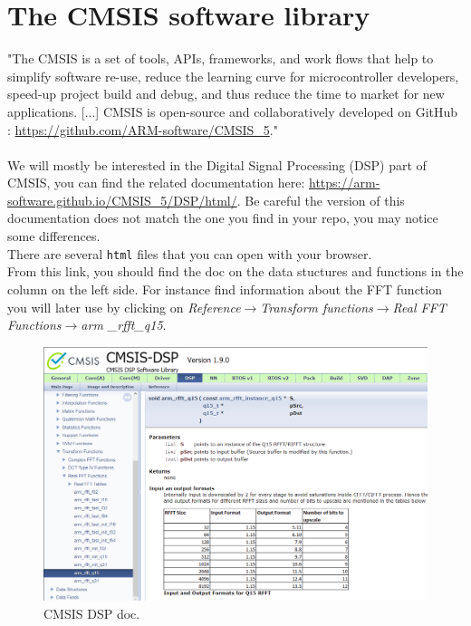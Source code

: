 \section{The CMSIS software library}
%
"The CMSIS is a set of tools, APIs, frameworks, and work flows that help to simplify software re-use, reduce the learning curve for microcontroller developers, speed-up project build and debug, and thus reduce the time to market for new applications. [...] CMSIS is open-source and collaboratively developed on GitHub : \url{https://github.com/ARM-software/CMSIS_5}." \\
\\
%
We will mostly be interested in the Digital Signal Processing (DSP) part of CMSIS, you can find the related documentation here: \url{https://arm-software.github.io/CMSIS_5/DSP/html/}. Be careful the version of this documentation does not match the one you find in your repo, you may notice some differences.\\
There are several \texttt{html} files that you can open with your browser. \\
From this link, you should find the doc on the data stuctures and functions in the column on the left side. For instance find information about the FFT function you will later use by clicking on \emph{Reference$\rightarrow$Transform functions$\rightarrow$Real FFT Functions$\rightarrow$arm \_rfft\_q15}.
%
\begin{figure}[H]
    \centering
    \includegraphics[width=\textwidth]{figs/CMSIS.png}
    \caption{CMSIS DSP doc.}
    \label{fig:CMSIS}
\end{figure}
%
